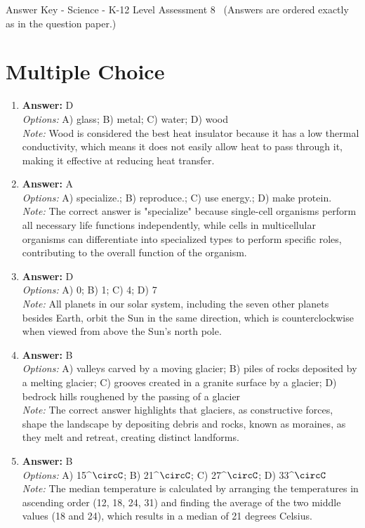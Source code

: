 \documentclass[12pt]{article}
\begin{document}
\begin{center}
Answer Key - Science - K-12 Level Assessment 8 \
\small (Answers are ordered exactly as in the question paper.)
\end{center}

\section*{Multiple Choice}
\begin{enumerate}[label=\arabic*.]
\item \textbf{Answer:} D
\\ \textit{Options:} A) glass; B) metal; C) water; D) wood
\\ \textit{Note:} Wood is considered the best heat insulator because it has a low thermal conductivity, which means it does not easily allow heat to pass through it, making it effective at reducing heat transfer.
\item \textbf{Answer:} A
\\ \textit{Options:} A) specialize.; B) reproduce.; C) use energy.; D) make protein.
\\ \textit{Note:} The correct answer is "specialize" because single-cell organisms perform all necessary life functions independently, while cells in multicellular organisms can differentiate into specialized types to perform specific roles, contributing to the overall function of the organism.
\item \textbf{Answer:} D
\\ \textit{Options:} A) 0; B) 1; C) 4; D) 7
\\ \textit{Note:} All planets in our solar system, including the seven other planets besides Earth, orbit the Sun in the same direction, which is counterclockwise when viewed from above the Sun's north pole.
\item \textbf{Answer:} B
\\ \textit{Options:} A) valleys carved by a moving glacier; B) piles of rocks deposited by a melting glacier; C) grooves created in a granite surface by a glacier; D) bedrock hills roughened by the passing of a glacier
\\ \textit{Note:} The correct answer highlights that glaciers, as constructive forces, shape the landscape by depositing debris and rocks, known as moraines, as they melt and retreat, creating distinct landforms.
\item \textbf{Answer:} B
\\ \textit{Options:} A) 15^\ensuremath{\circC}; B) 21^\ensuremath{\circC}; C) 27^\ensuremath{\circC}; D) 33^\ensuremath{\circC}
\\ \textit{Note:} The median temperature is calculated by arranging the temperatures in ascending order (12, 18, 24, 31) and finding the average of the two middle values (18 and 24), which results in a median of 21 degrees Celsius.
\end{enumerate}
\end{document}
